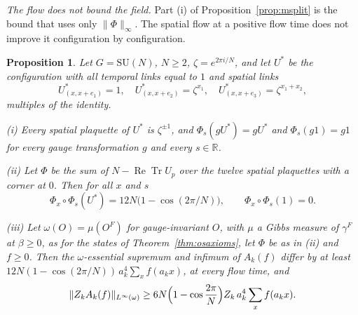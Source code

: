 \documentclass[aps,prd,twocolumn,superscriptaddress,nofootinbib,longbibliography,floatfix,amsmath,amssymb,10pt]{revtex4-2}
\newtheorem{proposition}[theorem]{Proposition}
\theoremstyle{definition}
\theoremstyle{remark}
\newcommand{\R}{\mathbb{R}}
\newcommand{\SU}{\mathrm{SU}}
\newcommand{\ReTr}{\operatorname{Re}\operatorname{Tr}}
\begin{document}
\emph{The flow does not bound the field.} Part (i) of
Proposition~\ref{prop:msplit} is the bound that uses only
$\|\Phi\|_\infty$. The spatial flow at a positive flow time does not
improve it configuration by configuration.

\begin{proposition}\label{prop:stationary}
Let $G=\SU(N)$, $N\ge2$, $\zeta=e^{2\pi i/N}$, and let $U^*$ be the
configuration with all temporal links equal to $1$ and spatial links
\[
U^*_{(x,x+e_1)}=1,\quad U^*_{(x,x+e_2)}=\zeta^{x_1},\quad
U^*_{(x,x+e_3)}=\zeta^{x_1+x_2},
\]
multiples of the identity.

\textup{(i)} Every spatial plaquette of $U^*$ is $\zeta^{\pm1}$, and
$\Phi_s(gU^*)=gU^*$ and $\Phi_s(g1)=g1$ for every gauge transformation
$g$ and every $s\in\R$.

\textup{(ii)} Let $\Phi$ be the sum of $N-\ReTr U_p$ over the twelve
spatial plaquettes with a corner at $0$. Then for all $x$ and $s$
\[
\Phi_x\circ\Phi_s(U^*)=12N\bigl(1-\cos(2\pi/N)\bigr),\qquad
\Phi_x\circ\Phi_s(1)=0 .
\]

\textup{(iii)} Let $\omega(O)=\mu(O^F)$ for gauge-invariant $O$, with
$\mu$ a Gibbs measure of $\gamma^F$ at $\beta\ge0$, as for the states of
Theorem~\textup{\ref{thm:osaxioms}}, let $\Phi$ be as in \textup{(ii)} and
$f\ge0$. Then the $\omega$-essential supremum and infimum of $A_k(f)$
differ by at least $12N(1-\cos(2\pi/N))\,a_k^4\sum_xf(a_kx)$, at every
flow time, and
\[
\|Z_kA_k(f)\|_{L^\infty(\omega)}\ge6N\Bigl(1-\cos\frac{2\pi}N\Bigr)Z_k\,
a_k^4\sum_xf(a_kx) .
\]
\end{proposition}
\end{document}
